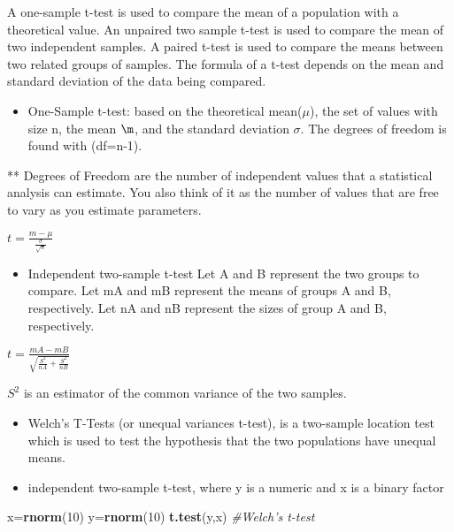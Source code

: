 \documentclass[
]{article}
\newenvironment{Shaded}{\begin{snugshade}}{\end{snugshade}}
\newcommand{\CommentTok}[1]{\textcolor[rgb]{0.56,0.35,0.01}{\textit{#1}}}
\newcommand{\DecValTok}[1]{\textcolor[rgb]{0.00,0.00,0.81}{#1}}
\newcommand{\KeywordTok}[1]{\textcolor[rgb]{0.13,0.29,0.53}{\textbf{#1}}}
\newcommand{\NormalTok}[1]{#1}
\providecommand{\tightlist}{%
  \setlength{\itemsep}{0pt}\setlength{\parskip}{0pt}}
\begin{document}
A one-sample t-test is used to compare the mean of a population with a
theoretical value. An unpaired two sample t-test is used to compare the
mean of two independent samples. A paired t-test is used to compare the
means between two related groups of samples. The formula of a t-test
depends on the mean and standard deviation of the data being compared.

\begin{itemize}
\tightlist
\item
  One-Sample t-test: based on the theoretical mean(\(\mu\)), the set of
  values with size n, the mean \(\m\), and the standard deviation
  \(\sigma\). The degrees of freedom is found with (df=n-1).
\end{itemize}

** Degrees of Freedom are the number of independent values that a
statistical analysis can estimate. You also think of it as the number of
values that are free to vary as you estimate parameters.

\(t = \frac{m-\mu}{\frac{\sigma}{\sqrt{n}}}\)

\begin{itemize}
\tightlist
\item
  Independent two-sample t-test Let A and B represent the two groups to
  compare. Let mA and mB represent the means of groups A and B,
  respectively. Let nA and nB represent the sizes of group A and B,
  respectively.
\end{itemize}

\(t = \frac{mA - mB}{\sqrt{\frac{S^2}{nA} + \frac{S^2}{nB}}}\)

\(S^2\) is an estimator of the common variance of the two samples.

\begin{itemize}
\item
  Welch's T-Tests (or unequal variances t-test), is a two-sample
  location test which is used to test the hypothesis that the two
  populations have unequal means.
\item
  independent two-sample t-test, where y is a numeric and x is a binary
  factor
\end{itemize}

\begin{Shaded}
\begin{Highlighting}[]
\NormalTok{x=}\KeywordTok{rnorm}\NormalTok{(}\DecValTok{10}\NormalTok{)}
\NormalTok{y=}\KeywordTok{rnorm}\NormalTok{(}\DecValTok{10}\NormalTok{)}
\KeywordTok{t.test}\NormalTok{(y,x)  }\CommentTok{#Welch's t-test}
\end{Highlighting}
\end{Shaded}
\end{document}
